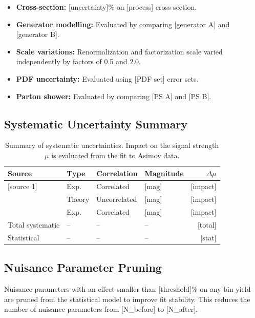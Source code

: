 \begin{itemize}
  \item \textbf{Cross-section:} [uncertainty]\% on [process] cross-section.
  \item \textbf{Generator modelling:} Evaluated by comparing [generator A]
        and [generator B].
  \item \textbf{Scale variations:} Renormalization and factorization scale
        varied independently by factors of 0.5 and 2.0.
  \item \textbf{PDF uncertainty:} Evaluated using [PDF set] error sets.
  \item \textbf{Parton shower:} Evaluated by comparing [PS A] and [PS B].
\end{itemize}

\subsection{Systematic Uncertainty Summary}
\label{sec:systematics:summary}


\begin{table}[htbp]
  \centering
  \caption{Summary of systematic uncertainties. Impact on the signal strength
           $\mu$ is evaluated from the fit to Asimov data.}
  \label{tab:systematics}
  \begin{tabular}{llllr}
    \toprule
    Source & Type & Correlation & Magnitude & $\Delta\mu$ \\
    \midrule
    [source 1] & Exp.    & Correlated   & [mag] & [impact] \\
    [source 2] & Theory  & Uncorrelated & [mag] & [impact] \\
    [source 3] & Exp.    & Correlated   & [mag] & [impact] \\
    \midrule
    Total systematic & -- & -- & -- & [total] \\
    Statistical      & -- & -- & -- & [stat]  \\
    \bottomrule
  \end{tabular}
\end{table}

\subsection{Nuisance Parameter Pruning}
\label{sec:systematics:pruning}


Nuisance parameters with an effect smaller than [threshold]\% on any
bin yield are pruned from the statistical model to improve fit stability.
This reduces the number of nuisance parameters from [N_before] to [N_after].
